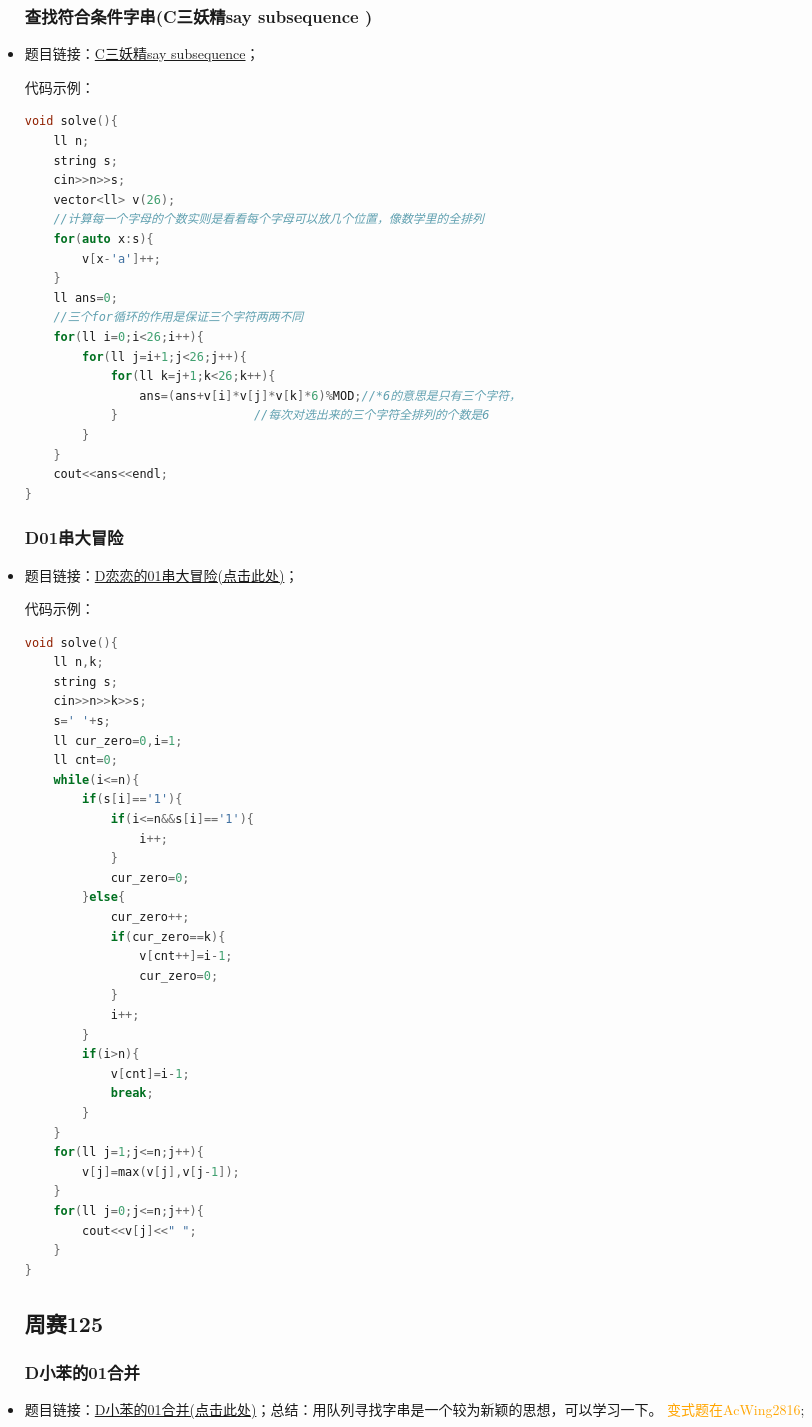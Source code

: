 \begin{itemize}
\subsubsection{查找符合条件字串(C三妖精say subsequence )}
\item 题目链接：\href{https://ac.nowcoder.com/acm/contest/124143/C}{C三妖精say subsequence}；

代码示例：\\
\begin{lstlisting}[language=C++]
void solve(){
	ll n;
	string s;
	cin>>n>>s;
	vector<ll> v(26);
	//计算每一个字母的个数实则是看看每个字母可以放几个位置，像数学里的全排列
	for(auto x:s){
		v[x-'a']++;
	}
	ll ans=0;
	//三个for循环的作用是保证三个字符两两不同
	for(ll i=0;i<26;i++){
		for(ll j=i+1;j<26;j++){
			for(ll k=j+1;k<26;k++){
				ans=(ans+v[i]*v[j]*v[k]*6)%MOD;//*6的意思是只有三个字符，
			}                   //每次对选出来的三个字符全排列的个数是6
		}
	}
	cout<<ans<<endl;
}
\end{lstlisting}
\subsubsection{D01串大冒险}
\item 题目链接：\href{https://ac.nowcoder.com/acm/contest/124143/D}{D恋恋的01串大冒险(点击此处)}；

代码示例：\\
\begin{lstlisting}[language=C++]
void solve(){
	ll n,k;
	string s;
	cin>>n>>k>>s;
	s=' '+s;
	ll cur_zero=0,i=1;
	ll cnt=0;
	while(i<=n){
		if(s[i]=='1'){
			if(i<=n&&s[i]=='1'){
				i++;
			}
			cur_zero=0;
		}else{
			cur_zero++;
			if(cur_zero==k){
				v[cnt++]=i-1;
				cur_zero=0;
			}
			i++;
		}
		if(i>n){
			v[cnt]=i-1;
			break;
		}
	}
	for(ll j=1;j<=n;j++){
		v[j]=max(v[j],v[j-1]);
	}
	for(ll j=0;j<=n;j++){
		cout<<v[j]<<" ";
	}
}
\end{lstlisting}
\subsection{周赛125}
\subsubsection{D小苯的01合并}
\item 题目链接：\href{https://ac.nowcoder.com/acm/contest/126319/D}{D小苯的01合并(点击此处)}；总结：用队列寻找字串是一个较为新颖的思想，可以学习一下。
\textcolor{orange}{变式题在AcWing2816};


\end{itemize}
